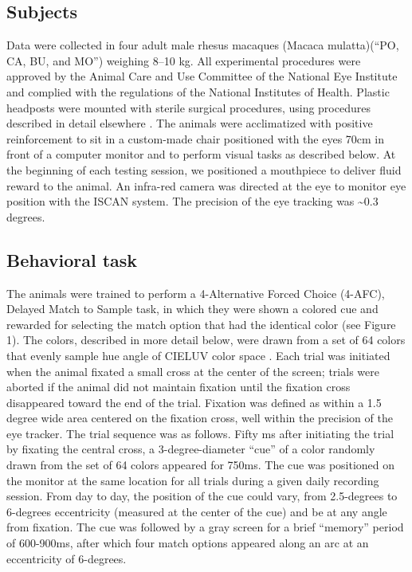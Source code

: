 \subsection{Subjects}

Data were collected in four adult male rhesus macaques (Macaca mulatta)(“PO, CA, BU, and MO”) weighing 8–10 kg. 
All experimental procedures were approved by the Animal Care and Use Committee of the National Eye Institute and complied with the regulations of the National Institutes of Health. 
Plastic headposts were mounted with sterile surgical procedures, using procedures described in detail elsewhere \citep{lafer-sousa_parallel_2013}. 
The animals were acclimatized with positive reinforcement to sit in a custom-made chair positioned with the eyes 70cm in front of a computer monitor and to perform visual tasks as described below. 
At the beginning of each testing session, we positioned a mouthpiece to deliver fluid reward to the animal. 
An infra-red camera was directed at the eye to monitor eye position with the ISCAN system. 
The precision of the eye tracking was \textasciitilde0.3 degrees. 

\subsection{Behavioral task}

The animals were trained to perform a 4-Alternative Forced Choice (4-AFC), Delayed Match to Sample task, in which they were shown a colored cue and rewarded for selecting the match option that had the identical color (see Figure 1). 
The colors, described in more detail below, were drawn from a set of 64 colors that evenly sample hue angle of CIELUV color space \citep{stockman_colorimetry_2010}. 
Each trial was initiated when the animal fixated a small cross at the center of the screen; trials were aborted if the animal did not maintain fixation until the fixation cross disappeared toward the end of the trial. 
Fixation was defined as within a 1.5 degree wide area centered on the fixation cross, well within the precision of the eye tracker.
The trial sequence was as follows. 
Fifty ms after initiating the trial by fixating the central cross, a 3-degree-diameter “cue”  of a color randomly drawn from the set of 64 colors appeared for 750ms. 
The cue was positioned on the monitor at the same location for all trials during a given daily recording session.
From day to day, the position of the cue could vary, from 2.5-degrees to 6-degrees eccentricity (measured at the center of the cue) and be at any angle from fixation.
The cue was followed by a gray screen for a brief “memory” period of 600-900ms, after which four match options appeared along an arc at an eccentricity of 6-degrees. 

